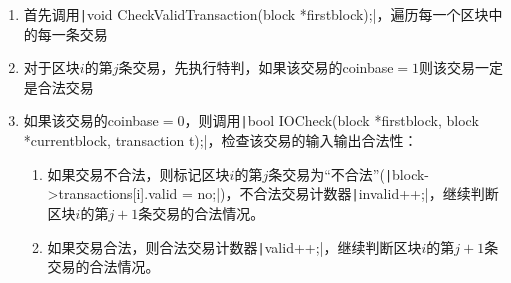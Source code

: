 \documentclass[10pt,a4paper]{article}
\begin{document}
    \begin{enumerate}
        \item 首先调用\texttt|void CheckValidTransaction(block *firstblock);|，遍历每一个区块中的每一条交易
        \item 对于区块$i$的第$j$条交易，先执行特判，如果该交易的coinbase$=1$则该交易一定是合法交易
        \item 如果该交易的coinbase$=0$，则调用\texttt|bool IOCheck(block *firstblock, block *currentblock, transaction t);|，检查该交易的输入输出合法性：
        \begin{enumerate}
            \item 如果交易不合法，则标记区块$i$的第$j$条交易为“不合法”(\texttt|block->transactions[i].valid = no;|)，不合法交易计数器\texttt|invalid++;|，继续判断区块$i$的第$j+1$条交易的合法情况。
            \item 如果交易合法，则合法交易计数器\texttt|valid++;|，继续判断区块$i$的第$j+1$条交易的合法情况。
        \end{enumerate}
    \end{enumerate}
    \newpage
\end{document}
